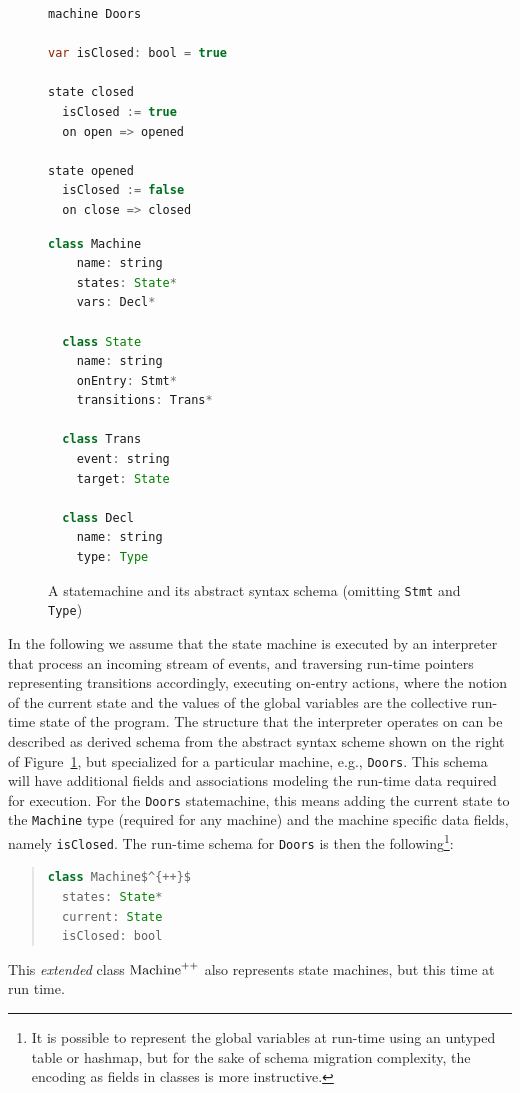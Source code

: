 \documentclass[english,submission]{programming}
\begin{document}
\begin{figure}[t]
\centering
\begin{minipage}[t]{0.4\textwidth}
\begin{lstlisting}[language=java,morekeywords={machine,on,state,var}]
machine Doors

var isClosed: bool = true

state closed
  isClosed := true
  on open => opened

state opened
  isClosed := false
  on close => closed
\end{lstlisting}
\end{minipage}
\hspace*{2pt}\vline
\begin{minipage}[t]{0.4\textwidth}
\begin{lstlisting}[language=java,morekeywords={on}]
  class Machine
    name: string
    states: State*
    vars: Decl*

  class State
    name: string
    onEntry: Stmt*
    transitions: Trans*

  class Trans
    event: string
    target: State

  class Decl
    name: string
    type: Type
  \end{lstlisting}
\end{minipage}
\caption{A statemachine and its abstract syntax schema (omitting \lstinline{Stmt} and \lstinline{Type})}
\label{LST:statemachines}
\end{figure}

In the following we assume that the state machine is executed by an interpreter that process an incoming stream of events, and traversing run-time pointers representing transitions accordingly, executing on-entry actions, where the notion of the current state and the values of the global variables are the collective run-time state of the program. The structure that the interpreter operates on can be described as derived  schema from the abstract syntax scheme shown on the right of Figure~\ref{LST:statemachines}, but specialized for a particular machine, e.g., \lstinline{Doors}.
This schema will have additional fields and associations modeling the run-time data required for execution. For the \lstinline{Doors} statemachine, this means adding the current state to the \lstinline{Machine} type (required for any machine) and the machine specific data fields, namely \lstinline{isClosed}. The run-time schema for \lstinline{Doors} is then the following\footnote{It is possible to represent the global variables at run-time using an untyped table or hashmap, but for the sake of schema migration complexity, the encoding as fields in classes is more instructive.}:
\begin{quote}
\begin{lstlisting}[language=java,morekeywords={on},mathescape=true]
class Machine$^{++}$
  states: State*
  current: State
  isClosed: bool
\end{lstlisting}
\end{quote}
This \textit{extended} class $\text{\lstinline{Machine}}^{++}$ also represents state machines, but this time at run time.
\end{document}
